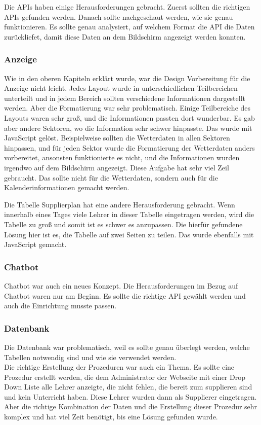 Die APIs haben einige Herausforderungen gebracht. Zuerst sollten die richtigen APIs gefunden werden. Danach sollte nachgeschaut werden, wie sie genau funktionieren. Es sollte genau analysiert, auf welchem Format die API die Daten zurückliefet, damit diese Daten an dem Bildschirm angezeigt werden konnten. 

\subsubsection{Anzeige}

Wie in den oberen Kapiteln erklärt wurde, war die Design Vorbereitung für die Anzeige nicht leicht. Jedes Layout wurde in unterschiedlichen Teilbereichen unterteilt und in jedem Bereich sollten verschiedene Informationen dargestellt werden. Aber die Formatierung war sehr problematisch. Einige Teilbereiche des Layouts waren sehr groß, und die Informationen passten dort wunderbar. Es gab aber andere Sektoren, wo die Information sehr schwer hinpasste. Das wurde mit JavaScript gelöst. Beispielweise sollten die Wetterdaten in allen Sektoren hinpassen, und für jeden Sektor wurde die Formatierung der Wetterdaten anders vorbereitet, ansonsten funktionierte es nicht, und die Informationen wurden irgendwo auf dem Bildschirm angezeigt. Diese Aufgabe hat sehr viel Zeil gebraucht. Das sollte nicht für die Wetterdaten, sondern auch für die Kalenderinformationen gemacht werden. 

Die Tabelle Supplierplan hat eine andere Herausforderung gebracht. Wenn innerhalb eines Tages viele Lehrer in dieser Tabelle eingetragen werden, wird die Tabelle zu groß und somit ist es schwer es anzupassen. Die hierfür gefundene Lösung hier ist es, die Tabelle auf zwei Seiten zu teilen. Das wurde ebenfalls mit JavaScript gemacht. 

\subsubsection{Chatbot}

Chatbot war auch ein neues Konzept. Die Herausforderungen im Bezug auf Chatbot waren nur am Beginn. Es sollte die richtige API gewählt werden und auch die Einrichtung musste passen. 

\subsubsection{Datenbank}

Die Datenbank war problematisch, weil es sollte genau überlegt werden, welche Tabellen notwendig sind und wie sie verwendet werden. \\
Die richtige Erstellung der Prozeduren war auch ein Thema. Es sollte eine Prozedur erstellt werden, die dem Administrator der Webseite mit einer Drop Down Liste alle Lehrer anzeigte, die nicht fehlen, die bereit zum supplieren sind und kein Unterricht haben. Diese Lehrer wurden dann als Supplierer eingetragen. Aber die richtige Kombination der Daten und die Erstellung dieser Prozedur sehr komplex und hat viel Zeit benötigt, bis eine Lösung gefunden wurde. 
